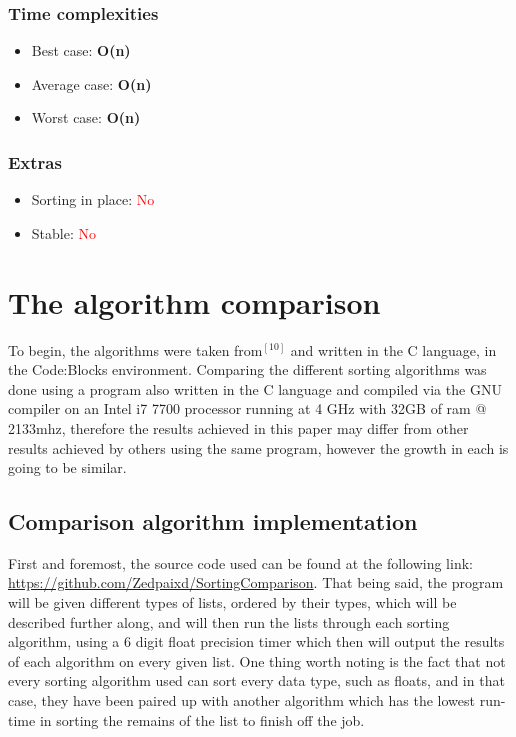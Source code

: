 \documentclass{article}
\begin{document}
\begin{multicols}{2}
\subsubsection{Time complexities}
\begin{itemize}
    \item Best case: \textbf{O(n)}
    \item Average case: \textbf{O(n)}
    \item Worst case: \textbf{O(n)}
\end{itemize}


\subsubsection{Extras}
\begin{itemize}
    \item Sorting in place: \textcolor{red}{No}
    \item Stable: \textcolor{red}{No}
\end{itemize}


\end{multicols}
\clearpage


\section{The algorithm comparison}
To begin, the algorithms were taken from$^{[10]}$ and written in the C language, in the Code:Blocks environment. Comparing the different sorting algorithms was done using a program also written in the C language and compiled via the GNU compiler on an Intel i7 7700 processor running at 4 GHz with 32GB of ram @ 2133mhz, therefore the results achieved in this paper may differ from other results achieved by others using the same program, however the growth in each is going to be similar. 
\subsection{Comparison algorithm implementation}
First and foremost, the source code used can be found at the following link:  \href{https://github.com/Zedpaixd/SortingComparison}{https://github.com/Zedpaixd/SortingComparison}. That being said, the program will be given different types of lists, ordered by their types, which will be described further along, and will then run the lists through each sorting algorithm, using a 6 digit float precision timer which then will output the results of each algorithm on every given list. One thing worth noting is the fact that not every sorting algorithm used can sort every data type, such as floats, and in that case, they have been paired up with another algorithm which has the lowest run-time in sorting the remains of the list to finish off the job.
\end{document}
